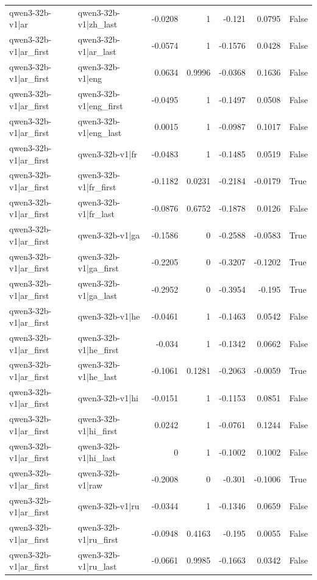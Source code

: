 \begin{table}
\begin{tabular}{l l r r r r l}
qwen3-32b-v1|ar & qwen3-32b-v1|zh_last & -0.0208 & 1 & -0.121 & 0.0795 & False \\
qwen3-32b-v1|ar_first & qwen3-32b-v1|ar_last & -0.0574 & 1 & -0.1576 & 0.0428 & False \\
qwen3-32b-v1|ar_first & qwen3-32b-v1|eng & 0.0634 & 0.9996 & -0.0368 & 0.1636 & False \\
qwen3-32b-v1|ar_first & qwen3-32b-v1|eng_first & -0.0495 & 1 & -0.1497 & 0.0508 & False \\
qwen3-32b-v1|ar_first & qwen3-32b-v1|eng_last & 0.0015 & 1 & -0.0987 & 0.1017 & False \\
qwen3-32b-v1|ar_first & qwen3-32b-v1|fr & -0.0483 & 1 & -0.1485 & 0.0519 & False \\
qwen3-32b-v1|ar_first & qwen3-32b-v1|fr_first & -0.1182 & 0.0231 & -0.2184 & -0.0179 & True \\
qwen3-32b-v1|ar_first & qwen3-32b-v1|fr_last & -0.0876 & 0.6752 & -0.1878 & 0.0126 & False \\
qwen3-32b-v1|ar_first & qwen3-32b-v1|ga & -0.1586 & 0 & -0.2588 & -0.0583 & True \\
qwen3-32b-v1|ar_first & qwen3-32b-v1|ga_first & -0.2205 & 0 & -0.3207 & -0.1202 & True \\
qwen3-32b-v1|ar_first & qwen3-32b-v1|ga_last & -0.2952 & 0 & -0.3954 & -0.195 & True \\
qwen3-32b-v1|ar_first & qwen3-32b-v1|he & -0.0461 & 1 & -0.1463 & 0.0542 & False \\
qwen3-32b-v1|ar_first & qwen3-32b-v1|he_first & -0.034 & 1 & -0.1342 & 0.0662 & False \\
qwen3-32b-v1|ar_first & qwen3-32b-v1|he_last & -0.1061 & 0.1281 & -0.2063 & -0.0059 & True \\
qwen3-32b-v1|ar_first & qwen3-32b-v1|hi & -0.0151 & 1 & -0.1153 & 0.0851 & False \\
qwen3-32b-v1|ar_first & qwen3-32b-v1|hi_first & 0.0242 & 1 & -0.0761 & 0.1244 & False \\
qwen3-32b-v1|ar_first & qwen3-32b-v1|hi_last & 0 & 1 & -0.1002 & 0.1002 & False \\
qwen3-32b-v1|ar_first & qwen3-32b-v1|raw & -0.2008 & 0 & -0.301 & -0.1006 & True \\
qwen3-32b-v1|ar_first & qwen3-32b-v1|ru & -0.0344 & 1 & -0.1346 & 0.0659 & False \\
qwen3-32b-v1|ar_first & qwen3-32b-v1|ru_first & -0.0948 & 0.4163 & -0.195 & 0.0055 & False \\
qwen3-32b-v1|ar_first & qwen3-32b-v1|ru_last & -0.0661 & 0.9985 & -0.1663 & 0.0342 & False \\

\end{tabular}
\end{table}
